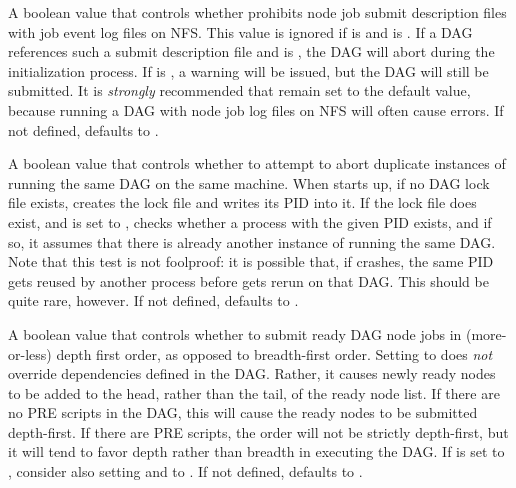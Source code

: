 \begin{description}
\label{param:DAGManLogOnNfsIsError}
\item[\Macro{DAGMAN\_LOG\_ON\_NFS\_IS\_ERROR}]
  A boolean value that controls whether  prohibits
  node job submit description files with job event log files on NFS.
  This value is ignored if  is 
   and
   is .
  If a DAG references such a submit description file and
   is ,
  the DAG will abort during the initialization process. 
  If  is , a warning
  will be issued, but the DAG will still be submitted.
  It is \emph{strongly}
  recommended that 
  remain set to the default value, because running a DAG with node job
  log files on NFS will often cause errors.
  If not defined,  defaults to
  .

\label{param:DAGManAbortDuplicates}
\item[\Macro{DAGMAN\_ABORT\_DUPLICATES}]
  A boolean value that controls whether to attempt to abort duplicate
  instances of  running the same DAG on the same
  machine.  When  starts up, if no DAG lock file exists,
   creates the lock file and writes its PID into it.  If
  the lock file does exist, and  is
  set to ,  checks whether a process with the
  given PID exists, and if so, it assumes that there is already another
  instance of  running the same DAG.  Note that this
  test is not foolproof: it is possible that, if  crashes,
  the same PID gets reused by another process before 
  gets rerun on that DAG.  This should be quite rare, however.
  If not defined,  defaults to
  .

\label{param:DAGManSubmitDepthFirst}
\item[\Macro{DAGMAN\_SUBMIT\_DEPTH\_FIRST}]
  A boolean value that controls whether to submit ready DAG node jobs
  in (more-or-less) depth first order, as opposed to breadth-first order.
  Setting  to  does
  \emph{not} override dependencies defined in the DAG.  Rather, it
  causes newly ready nodes to be added to the head, rather than the tail,
  of the ready node list.  If there are no PRE scripts in the DAG, this
  will cause the ready nodes to be submitted depth-first.  If there
  are PRE scripts, the order will not be strictly depth-first, but it
  will tend to favor depth rather than breadth in executing the DAG.
  If  is set to ,
  consider also setting  and
   to .
  If not defined,  defaults to
  .


\end{description}
